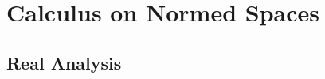 \documentclass[crop=false,class=article,oneside]{standalone}
\begin{document}
    \ifx\ifsub\undefined
        \section*{Calculus on Normed Spaces}
        \setcounter{section}{1}
    \fi
    \subsection{Real Analysis}
\end{document}

